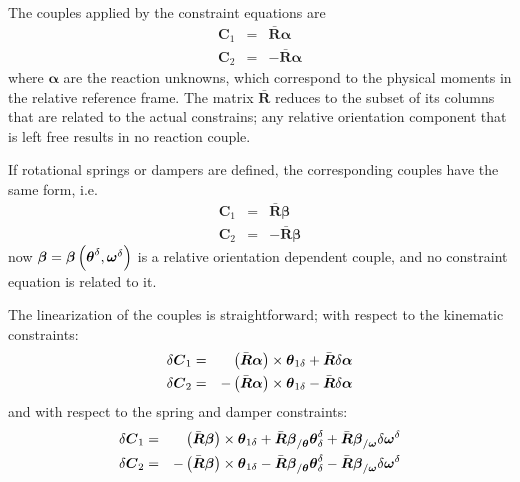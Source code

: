 \documentclass[10pt,dvips]{report}
\newcommand{\T}[1]{\boldsymbol{#1}}
\begin{document}
\noindent
The couples applied by the constraint equations are
\begin{eqnarray*}
	\T{C}_1 & = & \bar{\T{R}} \T{\alpha} \\
	\T{C}_2 & = & - \bar{\T{R}} \T{\alpha}
\end{eqnarray*}
where $\T{\alpha}$ are the reaction unknowns, which correspond 
to the physical moments in the relative reference frame.
The matrix $\bar{\T{R}}$ reduces to the subset of its columns 
that are related to the actual constrains; any relative orientation 
component that is left free results in no reaction couple.

\noindent
If rotational springs or dampers are defined, the corresponding
couples have the same form, i.e.\
\begin{eqnarray*}
	\T{C}_1 & = & \bar{\T{R}} \T{\beta} \\
	\T{C}_2 & = & - \bar{\T{R}} \T{\beta}
\end{eqnarray*}
now $\T{\beta}=\T{\beta}\plbr{\T{\theta}^{\delta},\T{\omega}^{\delta}}$ 
is a relative orientation dependent couple, and no constraint equation
is related to it.

The linearization of the couples is straightforward; with respect
to the kinematic constraints:
\begin{eqnarray*}
	\delta\T{C}_1 & = &
	\plbr{\bar{\T{R}} \T{\alpha}}\times\T{\theta}_{1\delta}
	+ \bar{\T{R}} \delta\T{\alpha} \\
	\delta\T{C}_2 & = &
	- \plbr{\bar{\T{R}} \T{\alpha}}\times\T{\theta}_{1\delta}
	- \bar{\T{R}} \delta\T{\alpha}
\end{eqnarray*}
and with respect to the spring and damper constraints:
\begin{eqnarray*}
	\delta\T{C}_1 & = &
	\plbr{\bar{\T{R}} \T{\beta}}\times\T{\theta}_{1\delta}
	+ \bar{\T{R}}\T{\beta}_{/\T{\theta}} \T{\theta}^{\delta}_{\delta}
	+ \bar{\T{R}}\T{\beta}_{/\T{\omega}} \delta\T{\omega}^{\delta} \\
	\delta\T{C}_2 & = &
	- \plbr{\bar{\T{R}} \T{\beta}}\times\T{\theta}_{1\delta}
	- \bar{\T{R}}\T{\beta}_{/\T{\theta}} \T{\theta}^{\delta}_{\delta}
	- \bar{\T{R}}\T{\beta}_{/\T{\omega}} \delta\T{\omega}^{\delta}
\end{eqnarray*}
\end{document}
